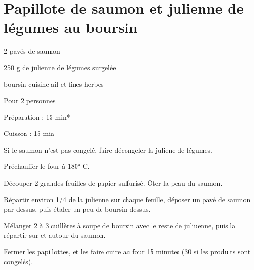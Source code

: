 \section[\normalsize{Papillote de saumon et julienne de l\'egumes au boursin}]{Papillote de saumon et julienne de légumes au boursin}

\begin{ingredients}
\item 2 pav\'es de saumon
\item 250 g de julienne de l\'egumes surgel\'ee
\item boursin cuisine ail et fines herbes
\end{ingredients}
\begin{infos}
\item Pour 2 personnes
\item Préparation : 15 min*
\item Cuisson : 15 min
\end{infos}
\begin{etapes}
\item Si le saumon n'est pas congel\'e, faire d\'econgeler la juliene de l\'egumes. 
\item Pr\'echauffer le four \`a 180° C.
\item D\'ecouper 2 grandes feuilles de papier sulfuris\'e. Ôter la peau du saumon. 
\item R\'epartir environ 1/4 de la julienne sur chaque feuille, d\'eposer un pav\'e de saumon par dessus, puis \'etaler un peu de boursin dessus.
\item M\'elanger 2 \`a 3 cuill\`eres \`a soupe de boursin avec le reste de juliuenne, puis la r\'epartir sur et autour du saumon.
\item Fermer les papillottes, et les faire cuire au four 15 minutes (30 si les produits sont congel\'es).
\end{etapes}
\begin{conseils}
\end{conseils}


